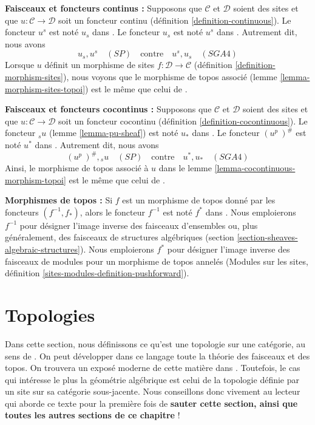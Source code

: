 \medskip\noindent
{\bf Faisceaux et foncteurs continus :}
Supposons que $\mathcal{C}$ et $\mathcal{D}$ soient des sites et que
$u : \mathcal{C} \to \mathcal{D}$ soit
un foncteur continu (définition \ref{definition-continuous}).
Le foncteur $u^s$ est noté $u_s$ dans \cite[Exposé III, 1.11]{SGA4}.
Le foncteur $u_s$ est noté $u^s$ dans
\cite[Exposé III, proposition 1.2]{SGA4}.
Autrement dit, nous avons
$$
u_s, u^s\quad(SP)
\quad\text{contre}\quad
u^s, u_s\quad(SGA4)
$$
Lorsque $u$ définit un morphisme de sites
$f : \mathcal{D} \to \mathcal{C}$
(définition \ref{definition-morphism-sites}),
nous voyons que le morphisme de topos associé
(lemme \ref{lemma-morphism-sites-topoi}) est le même que celui de
\cite[Exposé IV, (4.9.1.1)]{SGA4}.

\medskip\noindent
{\bf Faisceaux et foncteurs cocontinus :}
Supposons que $\mathcal{C}$ et $\mathcal{D}$ soient des sites et que
$u : \mathcal{C} \to \mathcal{D}$ soit
un foncteur cocontinu (définition \ref{definition-cocontinuous}).
Le foncteur ${}_su$ (lemme \ref{lemma-pu-sheaf}) est noté $u_*$ dans
\cite[Exposé III, proposition 2.3]{SGA4}.
Le foncteur $(u^p\ )^\#$ est noté $u^*$ dans
\cite[Exposé III, proposition 2.3]{SGA4}.
Autrement dit, nous avons
$$
(u^p\ )^\#, {}_su\quad(SP)
\quad\text{contre}\quad
u^*, u_*\quad(SGA4)
$$
Ainsi, le morphisme de topos associé à $u$ dans le
lemme \ref{lemma-cocontinuous-morphism-topoi}
est le même que celui de \cite[Exposé IV, 4.7]{SGA4}.

\medskip\noindent
{\bf Morphismes de topos :} Si $f$ est un morphisme de topos donné
par les foncteurs $(f^{-1}, f_*)$, alors le foncteur $f^{-1}$
est noté $f^*$ dans \cite[Exposé IV, définition 3.1]{SGA4}.
Nous emploierons $f^{-1}$ pour désigner l'image inverse des faisceaux d'ensembles
ou, plus généralement, des faisceaux de structures algébriques
(section \ref{section-sheaves-algebraic-structures}).
Nous emploierons $f^*$ pour désigner l'image inverse des faisceaux de modules
pour un morphisme de topos annelés
(Modules sur les sites, définition \ref{sites-modules-definition-pushforward}).



\section{Topologies}
\label{section-topologies}

\noindent
Dans cette section, nous définissons ce qu'est une topologie sur une catégorie,
au sens de \cite{SGA4}. On peut développer dans ce langage toute la théorie des
faisceaux et des topos. On trouvera un exposé moderne de cette matière
dans \cite{KS}. Toutefois, le cas qui intéresse le plus la géométrie algébrique
est celui de la topologie définie par un site sur sa catégorie sous-jacente.
Nous conseillons donc vivement au lecteur qui aborde ce texte pour la première fois de
{\bf sauter cette section, ainsi que toutes les autres sections de ce chapitre} !


